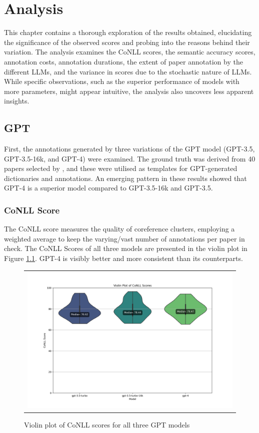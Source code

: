 \chapter{Analysis}\label{chapter:analysis}

This chapter contains a thorough exploration of the results obtained, elucidating the significance of the observed scores and probing into the reasons behind their variation. The analysis examines the CoNLL scores, the semantic accuracy scores, annotation costs, annotation durations, the extent of paper annotation by the different \ac{LLMs}, and the variance in scores due to the stochastic nature of \ac{LLMs}. While specific observations, such as the superior performance of models with more parameters, might appear intuitive, the analysis also uncovers less apparent insights.

\section{GPT}
First, the annotations generated by three variations of the GPT model (GPT-3.5, GPT-3.5-16k, and GPT-4) were examined. The ground truth was derived from 40 papers selected by \citet{asakura2022building}, and these were utilised as templates for GPT-generated dictionaries and annotations. An emerging pattern in these results showed that GPT-4 is a superior model compared to GPT-3.5-16k and GPT-3.5. 

\subsection{CoNLL Score}
The CoNLL score measures the quality of coreference clusters, employing a weighted average to keep the varying/vast number of annotations per paper in check. The CoNLL Scores of all three models are presented in the violin plot in Figure \ref{fig:violin-conll}. GPT-4 is visibly better and more consistent than its counterparts.

\begin{figure}[htpb]
  \centering
  \begin{tabular}{c}
  \includegraphics[width=14cm]{images/conll-score.png}
  \end{tabular}
  \caption[Distribution of CoNLL Score]{Violin plot of CoNLL scores for all three GPT models}\label{fig:violin-conll}
\end{figure}

